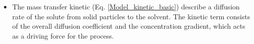 \documentclass[17pt, a0paper, portrait, margin=10mm, innermargin=15mm, blockverticalspace=15mm, colspace=15mm, subcolspace=8mm]{tikzposter}
\begin{document}
\begin{columns}
{				\begin{itemize}
					\item The mass transfer kinetic (Eq. \ref{Model_kinetic_basic}) describe a diffusion rate of the solute from solid particles to the solvent. The kinetic term consists of the overall diffusion coefficient and the concentration gradient, which acts as a driving force for the process.
					
%					


\end{itemize}}
\end{columns}
\end{document}
